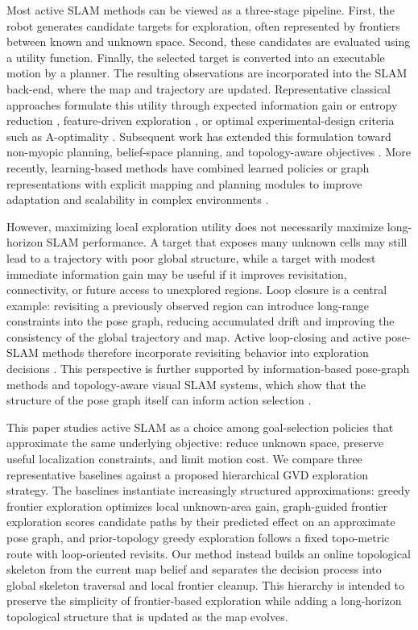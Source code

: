 \documentclass[conference]{IEEEtran}
\begin{document}
Most active SLAM methods can be viewed as a three-stage pipeline. First, the robot generates candidate targets for exploration, often represented by frontiers between known and unknown space. Second, these candidates are evaluated using a utility function. Finally, the selected target is converted into an executable motion by a planner. The resulting observations are incorporated into the SLAM back-end, where the map and trajectory are updated. Representative classical approaches formulate this utility through expected information gain or entropy reduction \cite{bourgault2002information,stachniss2005rbgain}, feature-driven exploration \cite{newman2003feature}, or optimal experimental-design criteria such as A-optimality \cite{sim2005aoptimal}. Subsequent work has extended this formulation toward non-myopic planning, belief-space planning, and topology-aware objectives \cite{leung2006mpc,valencia2012activepose,indelman2015bsp,mu2016topological}. More recently, learning-based methods have combined learned policies or graph representations with explicit mapping and planning modules to improve adaptation and scalability in complex environments \cite{chaplot2020neural,placed2020drl,chen2020graphs}.

However, maximizing local exploration utility does not necessarily maximize long-horizon SLAM performance. A target that exposes many unknown cells may still lead to a trajectory with poor global structure, while a target with modest immediate information gain may be useful if it improves revisitation, connectivity, or future access to unexplored regions. Loop closure is a central example: revisiting a previously observed region can introduce long-range constraints into the pose graph, reducing accumulated drift and improving the consistency of the global trajectory and map. Active loop-closing and active pose-SLAM methods therefore incorporate revisiting behavior into exploration decisions \cite{stachniss2004loopclosing,valencia2012activepose,kim2015areacoverage}. This perspective is further supported by information-based pose-graph methods and topology-aware visual SLAM systems, which show that the structure of the pose graph itself can inform action selection \cite{ila2010compact,placed2023explorb}.

This paper studies active SLAM as a choice among goal-selection policies that approximate the same underlying objective: reduce unknown space, preserve useful localization constraints, and limit motion cost. We compare three representative baselines against a proposed hierarchical GVD exploration strategy. The baselines instantiate increasingly structured approximations: greedy frontier exploration optimizes local unknown-area gain, graph-guided frontier exploration scores candidate paths by their predicted effect on an approximate pose graph, and prior-topology greedy exploration follows a fixed topo-metric route with loop-oriented revisits. Our method instead builds an online topological skeleton from the current map belief and separates the decision process into global skeleton traversal and local frontier cleanup. This hierarchy is intended to preserve the simplicity of frontier-based exploration while adding a long-horizon topological structure that is updated as the map evolves.
\end{document}
